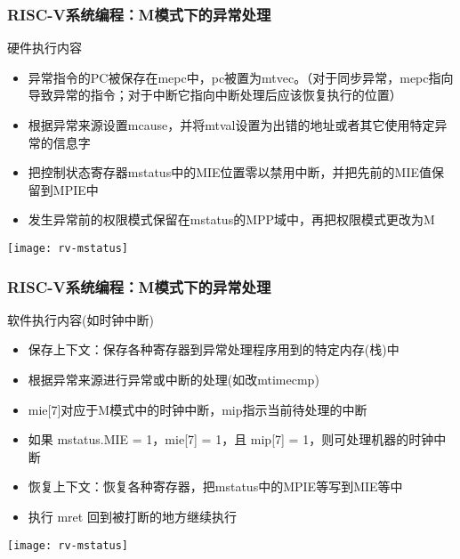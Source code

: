 \begin{frame}
    \frametitle{RISC-V系统编程：M模式下的异常处理}
    硬件执行内容
    \begin{itemize}
        \item 异常指令的PC被保存在mepc中，pc被置为mtvec。（对于同步异常，mepc指向导致异常的指令；对于中断它指向中断处理后应该恢复执行的位置）
        \item 根据异常来源设置mcause，并将mtval设置为出错的地址或者其它使用特定异常的信息字
        \item 把控制状态寄存器mstatus中的MIE位置零以禁用中断，并把先前的MIE值保留到MPIE中
        \item 发生异常前的权限模式保留在mstatus的MPP域中，再把权限模式更改为M
        
    \end{itemize}
    
        \centering
        \texttt{[image: rv-mstatus]}
    
\end{frame}


\begin{frame}
    \frametitle{RISC-V系统编程：M模式下的异常处理}
    软件执行内容(如时钟中断)
    \begin{itemize}
        \item 保存上下文：保存各种寄存器到异常处理程序用到的特定内存(栈)中
        \item 根据异常来源进行异常或中断的处理(如改mtimecmp)
        \item mie[7]对应于M模式中的时钟中断，mip指示当前待处理的中断
        \item 如果 mstatus.MIE = 1，mie[7] = 1，且 mip[7] = 1，则可处理机器的时钟中断
        \item 恢复上下文：恢复各种寄存器，把mstatus中的MPIE等写到MIE等中
        \item 执行 mret 回到被打断的地方继续执行
        
    \end{itemize}
    
    \centering
    \texttt{[image: rv-mstatus]}
    
\end{frame}

